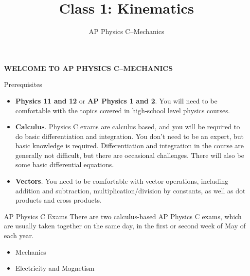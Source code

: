 \documentclass[12pt,compress,aspectratio=169,dvipsnames]{beamer}
\title{Class 1: Kinematics}
\subtitle{AP Physics C--Mechanics}
\begin{document}
\begin{frame}
  \centering\Large
  \textbf{WELCOME TO AP PHYSICS C--MECHANICS}
\end{frame}



\begin{frame}{Prerequisites}
  \begin{itemize}
  \item\textbf{Physics 11 and 12} or \textbf{AP Physics 1 and 2}. You will need
    to be comfortable with the topics covered in high-school level physics
    courses.
  \item\textbf{Calculus}. Physics C exams are calculus based, and you will be
    required to do basic differentiation and integration. You don't need to be
    an expert, but basic knowledge is required. Differentiation and integration
    in the course are generally not difficult, but there are occasional
    challenges. There will also be some basic differential equations.
  \item\textbf{Vectors}. You need to be comfortable with vector operations,
    including addition and subtraction, multiplication/division by constants,
    as well as dot products and cross products.
  \end{itemize}
\end{frame}



\begin{frame}{AP Physics C Exams}
  There are two calculus-based AP Physics C exams, which are usually taken
  together on the same day, in the first or second week of May of each year.
  \begin{itemize}
  \item<alert@1>Mechanics
  \item Electricity and Magnetism
  \end{itemize}
\end{frame}



\begin{frame}
  \titlepage
\end{frame}
\end{document}
